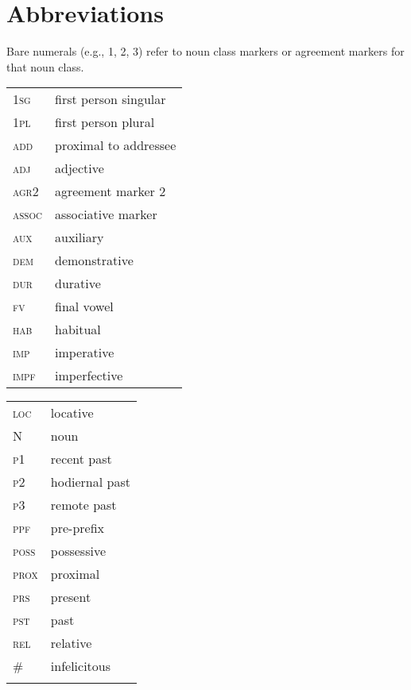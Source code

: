 \documentclass[output=paper,modfonts,nonflat]{langsci/langscibook}
\begin{document}
\section*{Abbreviations}
Bare numerals (e.g., 1, 2, 3) refer to noun class markers or agreement markers for that noun class.\\

\noindent\begin{tabularx}{.5\textwidth}{@{}lQ@{}}
\textsc{1sg} & first person singular\\
\textsc{1pl} & first person plural\\
\textsc{add} & proximal to addressee\\
\textsc{adj} & adjective\\
\textsc{agr2} & agreement marker 2\\
\textsc{assoc} & associative marker\\
\textsc{aux} & auxiliary\\
\textsc{dem} & demonstrative\\
\textsc{dur} & durative\\
\textsc{fv} & final vowel\\
\textsc{hab} & habitual\\
\textsc{imp} & imperative\\
\textsc{impf} & imperfective\\
\end{tabularx}%
\begin{tabularx}{.5\textwidth}{@{}lQ@{}}
\textsc{loc} & locative\\
N & noun\\
\textsc{p1} & recent past\\
\textsc{p2} & hodiernal past\\
\textsc{p3} & remote past\\
\textsc{ppf} & pre-prefix\\
\textsc{poss} & possessive\\
\textsc{prox} & proximal\\
\textsc{prs} & present\\
\textsc{pst} & past\\
\textsc{rel} & relative\\
\# & infelicitous\\
\\
\end{tabularx}

\sloppy
\printbibliography[heading=subbibliography,notkeyword=this]
\end{document}
